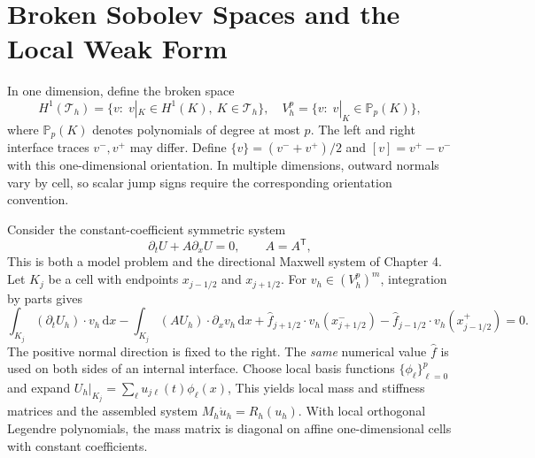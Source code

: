 \documentclass[11pt,openany]{book}
\numberwithin{equation}{chapter}
\theoremstyle{definition}
\theoremstyle{remark}
\newcommand{\dd}{\mathrm d}
\begin{document}
\section{Broken Sobolev Spaces and the Local Weak Form}\label{sec:broken}
In one dimension, define the broken space
\begin{equation}
H^1(\mathcal T_h)=\{v:\;v|_K\in H^1(K),\ K\in\mathcal T_h\},
\quad
V_h^p=\{v:\;v|_K\in\mathbb P_p(K)\},
\end{equation}
where $\mathbb P_p(K)$ denotes polynomials of degree at most $p$.
The left and right interface traces $v^-,v^+$ may differ.
Define $\{v\}=(v^-+v^+)/2$ and $[v]=v^+-v^-$ with this one-dimensional orientation.
In multiple dimensions, outward normals vary by cell, so scalar jump signs require the corresponding orientation convention.

Consider the constant-coefficient symmetric system
\begin{equation}\label{eq:dgmodel}
\partial_tU+A\partial_xU=0,\qquad A=A^\mathsf T,
\end{equation}
This is both a model problem and the directional Maxwell system of Chapter 4.
Let $K_j$ be a cell with endpoints $x_{j-1/2}$ and $x_{j+1/2}$.
For $v_h\in(V_h^p)^m$, integration by parts gives
\begin{equation}\label{eq:dgweak}
\int_{K_j}(\partial_tU_h)\cdot v_h\,\dd x
-\int_{K_j}(AU_h)\cdot\partial_xv_h\,\dd x
+\widehat f_{j+1/2}\cdot v_h(x_{j+1/2}^-)
-\widehat f_{j-1/2}\cdot v_h(x_{j-1/2}^+)=0.
\end{equation}
The positive normal direction is fixed to the right.
The \emph{same} numerical value $\widehat f$ is used on both sides of an internal interface.
Choose local basis functions $\{\phi_\ell\}_{\ell=0}^p$ and expand
$U_h|_{K_j}=\sum_\ell u_{j\ell}(t)\phi_\ell(x)$,
This yields local mass and stiffness matrices and the assembled system
$M_h\dot u_h=R_h(u_h)$.
With local orthogonal Legendre polynomials, the mass matrix is diagonal on affine one-dimensional cells with constant coefficients.
\end{document}
